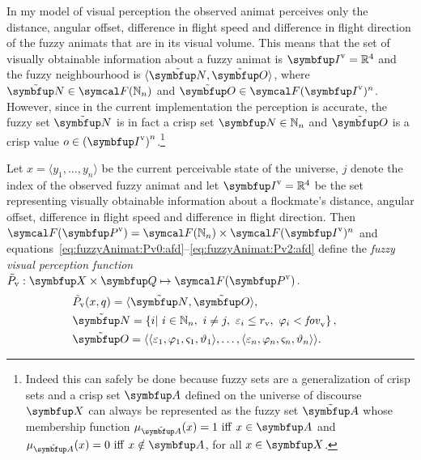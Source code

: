 In my model of visual perception the observed animat perceives only the distance, angular offset, difference in flight speed and difference in flight direction of the fuzzy animats that are in its visual volume. This means that the set of visually obtainable information about a fuzzy animat is $\set{I}^\textnormal{v}=\R^4$ and the fuzzy neighbourhood is $\langle\fset{N},\fset{O}\rangle$, where $\fset{N} \in \fpowset{\N_n}$ and $\fset{O} \in \fpowset{\set{I}^\textnormal{v}}^n$. However, since in the current implementation the perception is accurate, the fuzzy set $\fset{N}$ is in fact a crisp set $\set{N} \in \N_n$ and $\fset{O}$ is a crisp value $o \in {(\set{I}^\textnormal{v})}^n$.\footnote{Indeed this can safely be done because fuzzy sets are a generalization of crisp sets and a crisp set $\set{A}$ defined on the universe of discourse $\set{X}$ can always be represented as the fuzzy set $\fset{A}$ whose membership function $\mu_\fset{A}(x)=1\ \mathrm{iff}\ x \in \set{A}$ and $\mu_\fset{A}(x)=0\ \mathrm{iff}\ x \notin \set{A}$, for all $x \in \set{X}$.}

\begin{definition}
  \label{def:fuzzyAnimat:Pv:afd}
  Let $x=\langle y_1,\ldots,y_n\rangle$ be the current perceivable state of the universe, $j$ denote the index of the observed fuzzy animat and let $\set{I}^\textnormal{v}=\R^4$ be the set representing visually obtainable information about a flockmate's distance, angular offset, difference in flight speed and difference in flight direction. Then $\fpowset{\set{P}^\textnormal{v}}=\fpowset{\N_n} \times \fpowset{\set{I}^\textnormal{v}}^n$ and equations~\eqref{eq:fuzzyAnimat:Pv0:afd}--\eqref{eq:fuzzyAnimat:Pv2:afd} define the \emph{fuzzy visual perception function} $\ffunc{P}_\textnormal{v}: \set{X} \times \set{Q} \mapsto \fpowset{\set{P}^\textnormal{v}}$.
  \begin{eqnarray}
    & \ffunc{P}_\textnormal{v}(x,q)=\langle\fset{N},\fset{O}\rangle, & \label{eq:fuzzyAnimat:Pv0:afd} \\
    & \fset{N}=\left\{i|\ i \in \N_n,\ i \neq j,\ \varepsilon_i%
     \leq r_\textnormal{v},\ \varphi_i%
     < \fov_\textnormal{v} \right\}, & \\
    & \fset{O}=\langle \langle \varepsilon_1, \varphi_1, \varsigma_1, \vartheta_1 \rangle, \ldots,
    \langle \varepsilon_n, \varphi_n, \varsigma_n, \vartheta_n \rangle \rangle. & \label{eq:fuzzyAnimat:Pv2:afd}
  \end{eqnarray}
\end{definition}

